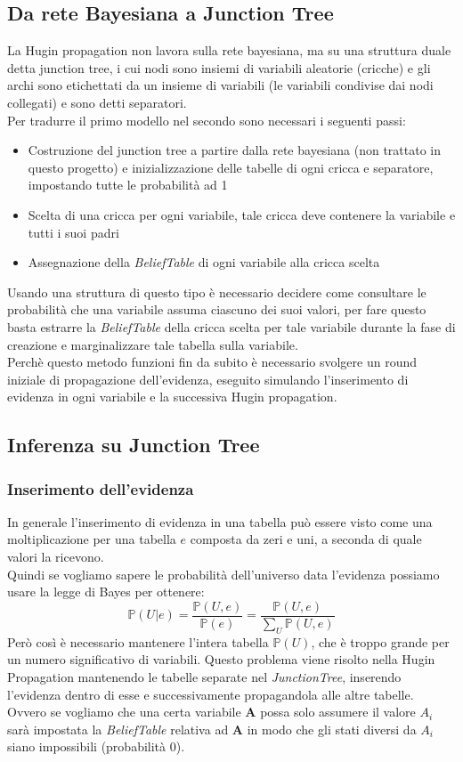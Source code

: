 \documentclass[a4paper]{article}
\begin{document}
\subsection{Da rete Bayesiana a Junction Tree}
La Hugin propagation non lavora sulla rete bayesiana, ma su una struttura duale detta junction tree, i cui nodi sono insiemi di variabili aleatorie (cricche) e gli archi sono etichettati da un insieme di variabili (le variabili condivise dai nodi collegati) e sono detti separatori.\\
Per tradurre il primo modello nel secondo sono necessari i seguenti passi:
\begin{itemize}
\item Costruzione del junction tree a partire dalla rete bayesiana (non trattato in questo progetto) e inizializzazione delle tabelle di ogni cricca e separatore, impostando tutte le probabilità ad 1
\item Scelta di una cricca per ogni variabile, tale cricca deve contenere la variabile e tutti i suoi padri
\item Assegnazione della \emph{BeliefTable} di ogni variabile alla cricca scelta
\end{itemize}
Usando una struttura di questo tipo è necessario decidere come consultare le probabilità che una variabile assuma ciascuno dei suoi valori, per fare questo basta estrarre la \emph{BeliefTable} della cricca scelta per tale variabile durante la fase di creazione e marginalizzare tale tabella sulla variabile.\\
Perchè questo metodo funzioni fin da subito è necessario svolgere un round iniziale di  propagazione dell'evidenza, eseguito simulando l'inserimento di evidenza in ogni variabile e la successiva Hugin propagation.
\subsection{Inferenza su Junction Tree}
\subsubsection{Inserimento dell'evidenza}
In generale l'inserimento di evidenza in una tabella può essere visto come una moltiplicazione per una tabella $e$ composta da zeri e uni, a seconda di quale valori la ricevono.\\
Quindi se vogliamo sapere le probabilità dell'universo data l'evidenza possiamo usare la legge di Bayes per ottenere:
$$ \mathbb{P}(U|e)= \frac{\mathbb{P}(U,e)}{\mathbb{P}(e)}=\frac{\mathbb{P}(U,e)}{\sum_U \mathbb{P}(U,e)}$$
Però così è necessario mantenere l'intera tabella $\mathbb{P}(U)$, che è troppo grande per un numero significativo di variabili. Questo problema viene risolto nella Hugin Propagation mantenendo le tabelle separate nel \emph{JunctionTree}, inserendo l'evidenza dentro di esse e successivamente propagandola alle altre tabelle.\\
Ovvero se vogliamo che una certa variabile \textbf{A} possa solo assumere il valore $A_i$ sarà impostata la \emph{BeliefTable} relativa ad \textbf{A} in modo che gli stati diversi da $A_i$ siano impossibili (probabilità 0).
\end{document}
